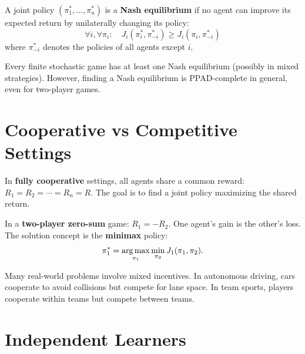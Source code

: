 \begin{definition}
A joint policy $(\pi_1^*, \ldots, \pi_n^*)$ is a \textbf{Nash equilibrium}
if no agent can improve its expected return by unilaterally changing its
policy:
\[
    \forall i, \forall \pi_i: \quad
    J_i(\pi_i^*, \pi_{-i}^*) \geq J_i(\pi_i, \pi_{-i}^*)
\]
where $\pi_{-i}^*$ denotes the policies of all agents except $i$.
\end{definition}

\begin{proposition}
Every finite stochastic game has at least one Nash equilibrium (possibly
in mixed strategies). However, finding a Nash equilibrium is PPAD-complete
in general, even for two-player games.
\end{proposition}

\section{Cooperative vs Competitive Settings}
\label{sec:marl:settings}

\begin{definition}
In \textbf{fully cooperative} settings, all agents share a common reward:
$R_1 = R_2 = \cdots = R_n = R$. The goal is to find a joint policy
maximizing the shared return.
\end{definition}

\begin{definition}
In a \textbf{two-player zero-sum} game: $R_1 = -R_2$. One agent's gain
is the other's loss. The solution concept is the \textbf{minimax} policy:
\[
    \pi_1^* = \operatorname*{arg\,max}_{\pi_1} \min_{\pi_2} J_1(\pi_1, \pi_2).
\]
\end{definition}

\begin{example}
Many real-world problems involve mixed incentives. In autonomous driving,
cars cooperate to avoid collisions but compete for lane space. In team
sports, players cooperate within teams but compete between teams.
\end{example}

\section{Independent Learners}
\label{sec:marl:independent}

